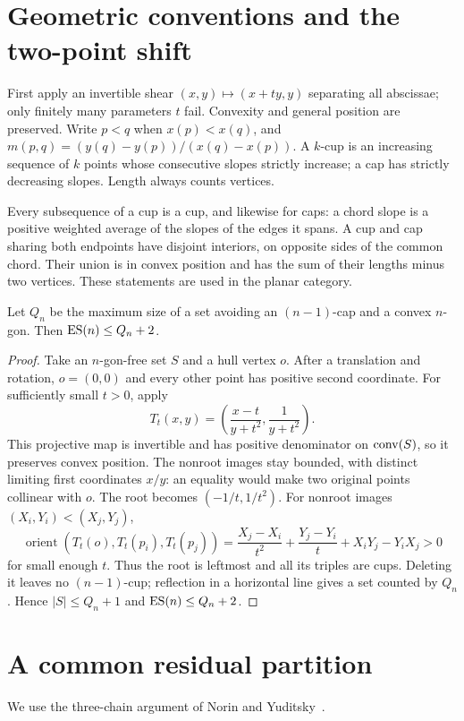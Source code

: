 \section{Geometric conventions and the two-point shift}\label{sec:geometry}
First apply an invertible shear $(x,y)\mapsto(x+ty,y)$ separating all
abscissae; only finitely many parameters $t$ fail. Convexity and general
position are preserved. Write $p<q$ when $x(p)<x(q)$, and
$m(p,q)=(y(q)-y(p))/(x(q)-x(p))$. A $k$-cup is an increasing sequence of
$k$ points whose consecutive slopes strictly increase; a cap has strictly
decreasing slopes. Length always counts vertices.

Every subsequence of a cup is a cup, and likewise for caps: a chord slope
is a positive weighted average of the slopes of the edges it spans.
A cup and cap sharing both endpoints have disjoint interiors, on opposite
sides of the common chord. Their union is in convex position and has the
sum of their lengths minus two vertices. These statements are used in
the planar category.

\begin{proposition}\label{prop:shift}
Let $Q_n$ be the maximum size of a set avoiding an $(n-1)$-cap and a convex $n$-gon. Then $\operatorname{ES}(n)\le Q_n+2$.
\end{proposition}
\begin{proof}
Take an $n$-gon-free set $S$ and a hull vertex $o$. After a translation
and rotation, $o=(0,0)$ and every other point has positive second
coordinate. For sufficiently small $t>0$, apply
\[
 T_t(x,y)=\left(\frac{x-t}{y+t^2},\frac1{y+t^2}\right).
\]
This projective map is invertible and has positive denominator on
$\operatorname{conv}(S)$, so it preserves convex position. The nonroot images stay
bounded, with distinct limiting first coordinates $x/y$: an equality
would make two original points collinear with $o$. The root becomes
$(-1/t,1/t^2)$. For nonroot images $(X_i,Y_i)<(X_j,Y_j)$,
\[
 \operatorname{orient}(T_t(o),T_t(p_i),T_t(p_j))
 =\frac{X_j-X_i}{t^2}+\frac{Y_j-Y_i}{t}+X_iY_j-Y_iX_j>0
\]
for small enough $t$. Thus the root is leftmost and all its triples
are cups. Deleting it leaves no $(n-1)$-cup; reflection in a horizontal
line gives a set counted by $Q_n$. Hence $|S|\le Q_n+1$ and
$\operatorname{ES}(n)\le Q_n+2$.
\end{proof}

\section{A common residual partition}\label{sec:partition}
We use the three-chain argument of Norin and Yuditsky~\cite[Claim~3.3]{NY}.

